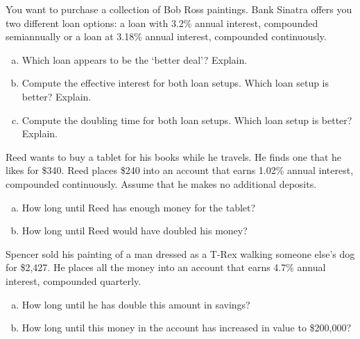 \documentclass[11pt,letterpaper]{article}
\begin{document}

 You want to purchase a collection of Bob Ross paintings. Bank Sinatra offers you two different loan options: a loan with 3.2\% annual interest, compounded semiannually or a loan at 3.18\% annual interest, compounded continuously. 
	\begin{enumerate}[(a)]
	\item Which loan appears to be the `better deal'? Explain. 
	\item Compute the effective interest for both loan setups. Which loan setup is better? Explain. 
	\item Compute the doubling time for both loan setups. Which loan setup is better? Explain.
	\end{enumerate}



\newpage



 Reed wants to buy a tablet for his books while he travels. He finds one that he likes for \$340. Reed places \$240 into an account that earns 1.02\% annual interest, compounded continuously. Assume that he makes no additional deposits. 
	\begin{enumerate}[(a)]
	\item How long until Reed has enough money for the tablet?
	\item How long until Reed would have doubled his money?
	\end{enumerate}



\newpage



 Spencer sold his painting of a man dressed as a T-Rex walking someone else's dog for \$2,427. He places all the money into an account that earns 4.7\% annual interest, compounded quarterly. 
	\begin{enumerate}[(a)]
	\item How long until he has double this amount in savings?
	\item How long until this money in the account has increased in value to \$200,000?
	\end{enumerate}
\end{document}
